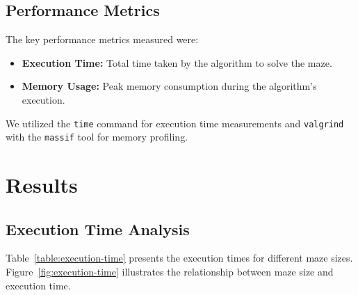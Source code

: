 \documentclass{article}
\begin{document}
\subsection*{Performance Metrics}

The key performance metrics measured were:

\begin{itemize}
    \item \textbf{Execution Time:} Total time taken by the algorithm to solve the maze.
    \item \textbf{Memory Usage:} Peak memory consumption during the algorithm's execution.
\end{itemize}

We utilized the \texttt{time} command for execution time measurements and \texttt{valgrind} with the \texttt{massif} tool for memory profiling.

\section*{Results}

\subsection*{Execution Time Analysis}

Table~\ref{table:execution-time} presents the execution times for different maze sizes. Figure~\ref{fig:execution-time} illustrates the relationship between maze size and execution time.
\end{document}
